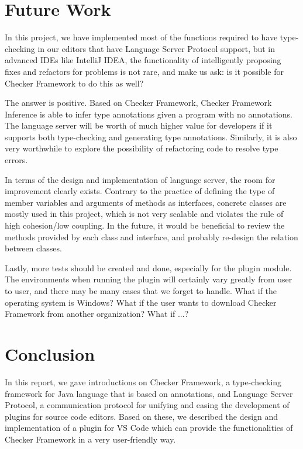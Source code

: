 \documentclass{article}
\begin{document}
\section{Future Work}

In this project, we have implemented most of the functions required to have type-checking in our editors that have Language Server Protocol support, but in advanced IDEs like IntelliJ IDEA, the functionality of intelligently proposing fixes and refactors for problems is not rare, and make us ask: is it possible for Checker Framework to do this as well?

The answer is positive. Based on Checker Framework, Checker Framework Inference\cite{cfi}\cite{cfirepo} is able to infer type annotations given a program with no annotations.  The language server will be worth of much higher value for developers if it supports both type-checking and generating type annotations.  Similarly, it is also very worthwhile to explore the possibility of refactoring code to resolve type errors.

In terms of the design and implementation of language server, the room for improvement clearly exists.  Contrary to the practice of defining the type of member variables and arguments of methods as interfaces, concrete classes are mostly used in this project, which is not very scalable and violates the rule of high cohesion/low coupling.  In the future, it would be beneficial to review the methods provided by each class and interface, and probably re-design the relation between classes.

Lastly, more tests should be created and done, especially for the plugin module. The environments when running the plugin will certainly vary greatly from user to user, and there may be many cases that we forget to handle. What if the operating system is Windows? What if the user wants to download Checker Framework from another organization? What if ...?


\section{Conclusion}

In this report, we gave introductions on Checker Framework, a type-checking framework for Java language that is based on annotations, and Language Server Protocol, a communication protocol for unifying and easing the development of plugins for source code editors. Based on these, we described the design and implementation of a plugin for VS Code which can provide the functionalities of Checker Framework in a very user-friendly way.
\end{document}
